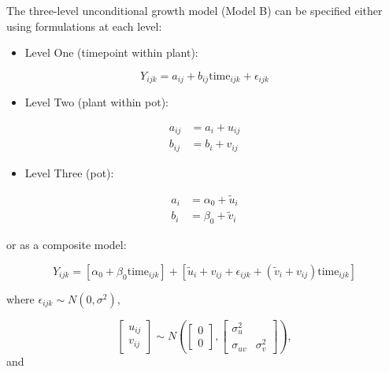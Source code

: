 \documentclass[
]{krantz}
\providecommand{\tightlist}{%
  \setlength{\itemsep}{0pt}\setlength{\parskip}{0pt}}
\begin{document}
The three-level unconditional growth model (Model B) can be specified either using formulations at each level:

\begin{itemize}
\tightlist
\item
  Level One (timepoint within plant):
\end{itemize}

\begin{equation*}
Y_{ijk} = a_{ij}+b_{ij}\textrm{time}_{ijk}+\epsilon_{ijk}
\end{equation*}

\begin{itemize}
\tightlist
\item
  Level Two (plant within pot):
\end{itemize}

\begin{align*}
a_{ij} & = a_{i}+u_{ij} \\
b_{ij} & = b_{i}+v_{ij}
\end{align*}

\begin{itemize}
\tightlist
\item
  Level Three (pot):
\end{itemize}

\begin{align*}
a_{i} & = \alpha_{0}+\tilde{u}_{i} \\
b_{i} & = \beta_{0}+\tilde{v}_{i}
\end{align*}

or as a composite model:

\begin{equation*}
Y_{ijk}=[\alpha_{0}+\beta_{0}\textrm{time}_{ijk}]+
[\tilde{u}_{i}+{v}_{ij}+\epsilon_{ijk}+(\tilde{v}_{i}+{v}_{ij})\textrm{time}_{ijk}]
\end{equation*}

where \(\epsilon_{ijk}\sim N(0,\sigma^2)\),

\[ \left[ \begin{array}{c}
            u_{ij} \\ v_{ij}
          \end{array}  \right] \sim N \left( \left[
          \begin{array}{c}
            0 \\ 0
          \end{array} \right], \left[
          \begin{array}{cc}
            \sigma_{u}^{2} & \\
            \sigma_{uv} & \sigma_{v}^{2}
          \end{array} \right] \right), \] and
\end{document}
